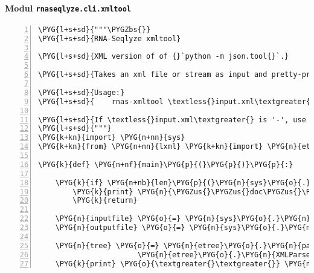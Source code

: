 \paragraph{Modul \texttt{rnaseqlyze.cli.xmltool}}
\label{rnaseqlyze-pdf:modul-rnaseqlyze-cli-xmltool}
\begin{Verbatim}[commandchars=\\\{\},numbers=left,firstnumber=1,stepnumber=5]
\PYG{l+s+sd}{"""\PYGZbs{}}
\PYG{l+s+sd}{RNA-Seqlyze xmltool}

\PYG{l+s+sd}{XML version of of {}`python -m json.tool{}`.}

\PYG{l+s+sd}{Takes an xml file or stream as input and pretty-prints it.}

\PYG{l+s+sd}{Usage:}
\PYG{l+s+sd}{    rnas-xmltool \textless{}input.xml\textgreater{} \textless{}output.xml\textgreater{}}

\PYG{l+s+sd}{If \textless{}input.xml\textgreater{} is '-', use 'sys.stdin, if \textless{}output.xml\textgreater{} is '-', use 'sys.stdout'.}
\PYG{l+s+sd}{"""}
\PYG{k+kn}{import} \PYG{n+nn}{sys}
\PYG{k+kn}{from} \PYG{n+nn}{lxml} \PYG{k+kn}{import} \PYG{n}{etree}

\PYG{k}{def} \PYG{n+nf}{main}\PYG{p}{(}\PYG{p}{)}\PYG{p}{:}

    \PYG{k}{if} \PYG{n+nb}{len}\PYG{p}{(}\PYG{n}{sys}\PYG{o}{.}\PYG{n}{argv}\PYG{p}{)} \PYG{o}{\textless{}} \PYG{l+m+mi}{2} \PYG{o+ow}{or} \PYG{n}{sys}\PYG{o}{.}\PYG{n}{argv}\PYG{p}{[}\PYG{l+m+mi}{1}\PYG{p}{]} \PYG{o+ow}{in} \PYG{p}{(}\PYG{l+s}{'}\PYG{l+s}{-h}\PYG{l+s}{'}\PYG{p}{,} \PYG{l+s}{'}\PYG{l+s}{--help}\PYG{l+s}{'}\PYG{p}{)}\PYG{p}{:}
        \PYG{k}{print} \PYG{n}{\PYGZus{}\PYGZus{}doc\PYGZus{}\PYGZus{}}
        \PYG{k}{return}

    \PYG{n}{inputfile} \PYG{o}{=} \PYG{n}{sys}\PYG{o}{.}\PYG{n}{argv}\PYG{p}{[}\PYG{l+m+mi}{1}\PYG{p}{]} \PYG{o}{==} \PYG{l+s}{'}\PYG{l+s}{-}\PYG{l+s}{'} \PYG{o+ow}{and} \PYG{n}{sys}\PYG{o}{.}\PYG{n}{stdin} \PYG{o+ow}{or} \PYG{n+nb}{open}\PYG{p}{(}\PYG{n}{sys}\PYG{o}{.}\PYG{n}{argv}\PYG{p}{[}\PYG{l+m+mi}{1}\PYG{p}{]}\PYG{p}{)}
    \PYG{n}{outputfile} \PYG{o}{=} \PYG{n}{sys}\PYG{o}{.}\PYG{n}{argv}\PYG{p}{[}\PYG{l+m+mi}{2}\PYG{p}{]} \PYG{o}{==} \PYG{l+s}{'}\PYG{l+s}{-}\PYG{l+s}{'} \PYG{o+ow}{and} \PYG{n}{sys}\PYG{o}{.}\PYG{n}{stdout} \PYG{o+ow}{or} \PYG{n+nb}{open}\PYG{p}{(}\PYG{n}{sys}\PYG{o}{.}\PYG{n}{argv}\PYG{p}{[}\PYG{l+m+mi}{2}\PYG{p}{]}\PYG{p}{,} \PYG{l+s}{"}\PYG{l+s}{w}\PYG{l+s}{"}\PYG{p}{)}

    \PYG{n}{tree} \PYG{o}{=} \PYG{n}{etree}\PYG{o}{.}\PYG{n}{parse}\PYG{p}{(}\PYG{n}{inputfile}\PYG{p}{,}
                       \PYG{n}{etree}\PYG{o}{.}\PYG{n}{XMLParser}\PYG{p}{(}\PYG{n}{remove\PYGZus{}blank\PYGZus{}text}\PYG{o}{=}\PYG{n+nb+bp}{True}\PYG{p}{)}\PYG{p}{)}
    \PYG{k}{print} \PYG{o}{\textgreater{}\textgreater{}} \PYG{n}{outputfile}\PYG{p}{,} \PYG{n}{etree}\PYG{o}{.}\PYG{n}{tostring}\PYG{p}{(}\PYG{n}{tree}\PYG{o}{.}\PYG{n}{getroot}\PYG{p}{(}\PYG{p}{)}\PYG{p}{,} \PYG{n}{pretty\PYGZus{}print}\PYG{o}{=}\PYG{n+nb+bp}{True}\PYG{p}{)}
\end{Verbatim}


